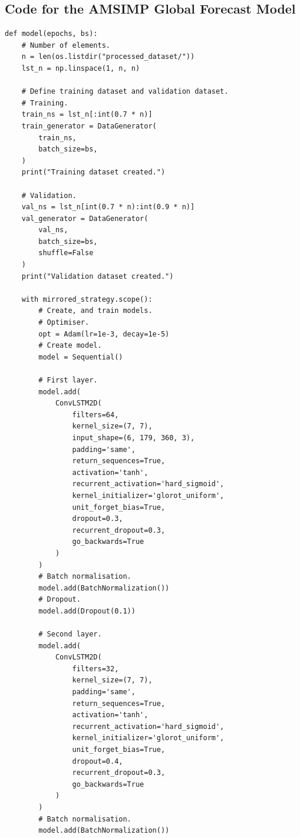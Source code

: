 \begin{appendices}
    \section{Code for the AMSIMP Global Forecast Model}\label{model_code}
    \begin{verbatim}
def model(epochs, bs):
    # Number of elements.
    n = len(os.listdir("processed_dataset/"))
    lst_n = np.linspace(1, n, n)
    
    # Define training dataset and validation dataset.
    # Training.
    train_ns = lst_n[:int(0.7 * n)]
    train_generator = DataGenerator(
        train_ns,
        batch_size=bs,
    )
    print("Training dataset created.")
    
    # Validation.
    val_ns = lst_n[int(0.7 * n):int(0.9 * n)]
    val_generator = DataGenerator(
        val_ns, 
        batch_size=bs,
        shuffle=False
    )
    print("Validation dataset created.")
    
    with mirrored_strategy.scope():
        # Create, and train models.
        # Optimiser.
        opt = Adam(lr=1e-3, decay=1e-5)
        # Create model.
        model = Sequential()

        # First layer.
        model.add(
            ConvLSTM2D(
                filters=64, 
                kernel_size=(7, 7),
                input_shape=(6, 179, 360, 3), 
                padding='same', 
                return_sequences=True, 
                activation='tanh', 
                recurrent_activation='hard_sigmoid',
                kernel_initializer='glorot_uniform', 
                unit_forget_bias=True, 
                dropout=0.3, 
                recurrent_dropout=0.3, 
                go_backwards=True
            )
        )
        # Batch normalisation.
        model.add(BatchNormalization())
        # Dropout.
        model.add(Dropout(0.1))
        
        # Second layer.
        model.add(
            ConvLSTM2D(
                filters=32, 
                kernel_size=(7, 7), 
                padding='same', 
                return_sequences=True, 
                activation='tanh', 
                recurrent_activation='hard_sigmoid', 
                kernel_initializer='glorot_uniform', 
                unit_forget_bias=True, 
                dropout=0.4, 
                recurrent_dropout=0.3, 
                go_backwards=True
            )
        )
        # Batch normalisation.
        model.add(BatchNormalization())
        

\end{verbatim}
\end{appendices}
